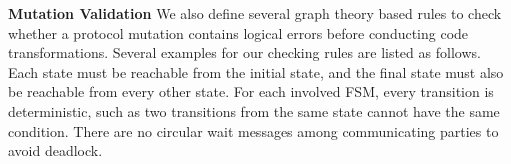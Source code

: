 {\textbf{Mutation Validation}}
We also define several graph theory based rules to check whether
a protocol mutation contains logical errors 
before conducting code transformations. 
Several examples for our checking rules are listed as follows.
Each state must be reachable from the initial state, 
and the final state must also be reachable from every other state.
For each involved FSM, every transition is deterministic, such as
two transitions from the same state cannot have the same condition. 
There are no circular wait messages among communicating parties to avoid deadlock. 



